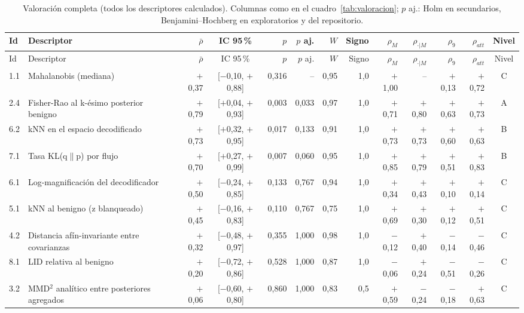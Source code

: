 \begin{longtable}{@{}l>{\raggedright\arraybackslash}p{3.6cm}rcrrrrrrrrc@{}}
\caption{Valoración completa (todos los descriptores calculados). Columnas como en el cuadro~\ref{tab:valoracion}; $p$ aj.: Holm en secundarios, Benjamini--Hochberg en exploratorios y del repositorio.}\label{tab:valoracion-completa}\\
\toprule
Id & Descriptor & $\bar\rho$ & IC 95\,\% & $p$ & $p$ aj. & $W$ & Signo & $\rho_{M}$ & $\rho_{\cdot|M}$ & $\rho_{9}$ & $\rho_{att}$ & Nivel \\
\midrule
\endfirsthead
\toprule
Id & Descriptor & $\bar\rho$ & IC 95\,\% & $p$ & $p$ aj. & $W$ & Signo & $\rho_{M}$ & $\rho_{\cdot|M}$ & $\rho_{9}$ & $\rho_{att}$ & Nivel \\
\midrule
\endhead
1.1 & Mahalanobis (mediana) & $+$0{,}37 & [$-$0{,}10, $+$0{,}88] & 0{,}316 & -- & 0{,}95 & 1{,}0 & $+$1{,}00 & -- & $+$0{,}13 & $+$0{,}72 & C \\
2.4 & Fisher-Rao al k-ésimo posterior benigno & $+$0{,}79 & [$+$0{,}04, $+$0{,}93] & 0{,}003 & 0{,}033 & 0{,}97 & 1{,}0 & $+$0{,}71 & $+$0{,}80 & $+$0{,}63 & $+$0{,}73 & A \\
6.2 & kNN en el espacio decodificado & $+$0{,}73 & [$+$0{,}32, $+$0{,}95] & 0{,}017 & 0{,}133 & 0{,}91 & 1{,}0 & $+$0{,}73 & $+$0{,}73 & $+$0{,}60 & $+$0{,}63 & B \\
7.1 & Tasa KL(q$\|$p) por flujo & $+$0{,}70 & [$+$0{,}27, $+$0{,}99] & 0{,}007 & 0{,}060 & 0{,}95 & 1{,}0 & $+$0{,}85 & $+$0{,}79 & $+$0{,}51 & $+$0{,}83 & B \\
6.1 & Log-magnificación del decodificador & $+$0{,}50 & [$-$0{,}24, $+$0{,}85] & 0{,}133 & 0{,}767 & 0{,}94 & 1{,}0 & $+$0{,}34 & $+$0{,}43 & $+$0{,}10 & $+$0{,}14 & C \\
5.1 & kNN al benigno (z blanqueado) & $+$0{,}45 & [$-$0{,}16, $+$0{,}83] & 0{,}110 & 0{,}767 & 0{,}75 & 1{,}0 & $+$0{,}69 & $+$0{,}30 & $+$0{,}12 & $+$0{,}51 & C \\
4.2 & Distancia afín-invariante entre covarianzas & $+$0{,}32 & [$-$0{,}48, $+$0{,}97] & 0{,}355 & 1{,}000 & 0{,}98 & 1{,}0 & $-$0{,}12 & $+$0{,}40 & $-$0{,}14 & $-$0{,}46 & C \\
8.1 & LID relativa al benigno & $+$0{,}20 & [$-$0{,}72, $+$0{,}86] & 0{,}528 & 1{,}000 & 0{,}87 & 1{,}0 & $-$0{,}06 & $+$0{,}24 & $-$0{,}51 & $-$0{,}26 & C \\
3.2 & MMD$^2$ analítico entre posteriores agregados & $+$0{,}06 & [$-$0{,}60, $+$0{,}80] & 0{,}860 & 1{,}000 & 0{,}83 & 0{,}5 & $+$0{,}59 & $-$0{,}24 & $-$0{,}18 & $+$0{,}63 & C \\

\end{longtable}
